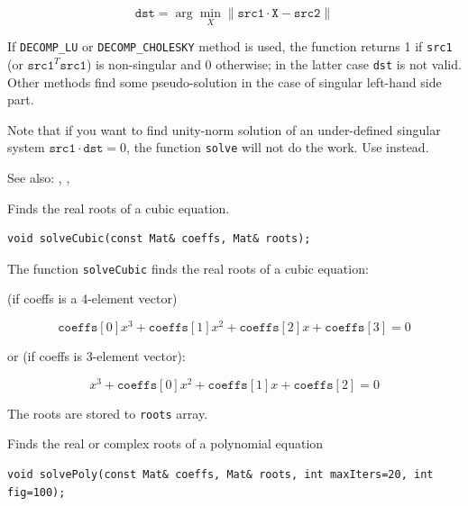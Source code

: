 \[
\texttt{dst} = \arg \min_X\|\texttt{src1}\cdot\texttt{X} - \texttt{src2}\|
\]

If \texttt{DECOMP\_LU} or \texttt{DECOMP\_CHOLESKY} method is used, the function returns 1 if \texttt{src1} (or $\texttt{src1}^T\texttt{src1}$) is non-singular and 0 otherwise; in the latter case \texttt{dst} is not valid. Other methods find some pseudo-solution in the case of singular left-hand side part.

Note that if you want to find unity-norm solution of an under-defined singular system $\texttt{src1}\cdot\texttt{dst}=0$, the function \texttt{solve} will not do the work. Use  instead.

See also: , , 

\label{solveCubic}
Finds the real roots of a cubic equation.

\begin{lstlisting}
void solveCubic(const Mat& coeffs, Mat& roots);
\end{lstlisting}
\begin{description}
\end{description}

The function \texttt{solveCubic} finds the real roots of a cubic equation:

(if coeffs is a 4-element vector)

\[
\texttt{coeffs}[0] x^3 + \texttt{coeffs}[1] x^2 + \texttt{coeffs}[2] x + \texttt{coeffs}[3] = 0
\]

or (if coeffs is 3-element vector):

\[
x^3 + \texttt{coeffs}[0] x^2 + \texttt{coeffs}[1] x + \texttt{coeffs}[2] = 0
\]

The roots are stored to \texttt{roots} array.

\label{solvePoly}
Finds the real or complex roots of a polynomial equation

\begin{lstlisting}
void solvePoly(const Mat& coeffs, Mat& roots, int maxIters=20, int fig=100);
\end{lstlisting}
\begin{description}
\end{description}

